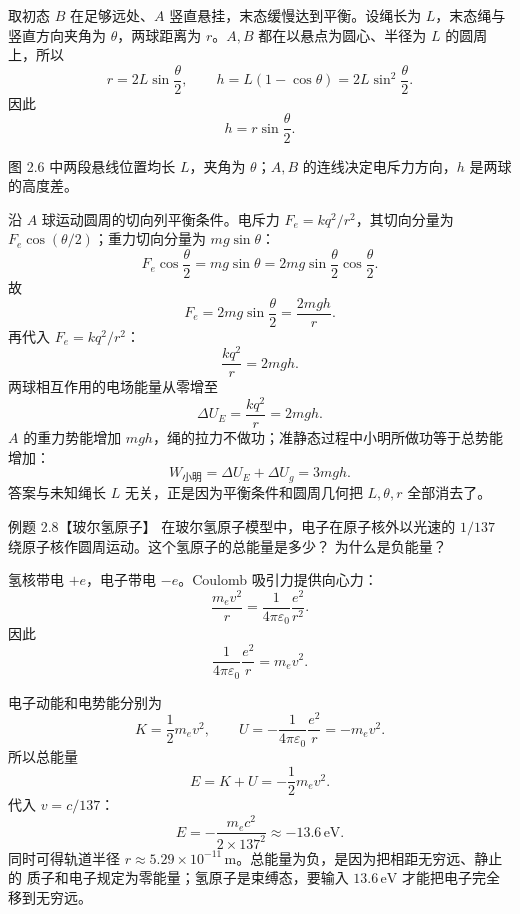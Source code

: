 \begin{xesolution}
取初态 $B$ 在足够远处、$A$ 竖直悬挂，末态缓慢达到平衡。设绳长为 $L$，末态绳与竖直方向夹角为
$\theta$，两球距离为 $r$。$A,B$ 都在以悬点为圆心、半径为 $L$ 的圆周上，所以
\[
  r=2L\sin\frac\theta2,
  \qquad h=L(1-\cos\theta)=2L\sin^2\frac\theta2.
\]
因此
\[
  \boxed{h=r\sin\frac\theta2}.
\]

图 2.6 中两段悬线位置均长 $L$，夹角为 $\theta$；$A,B$ 的连线决定电斥力方向，$h$ 是两球的高度差。

\repellingSpheresFigure
{}

沿 $A$ 球运动圆周的切向列平衡条件。电斥力
$F_e=kq^2/r^2$，其切向分量为 $F_e\cos(\theta/2)$；重力切向分量为 $mg\sin\theta$：
\[
  F_e\cos\frac\theta2=mg\sin\theta
  =2mg\sin\frac\theta2\cos\frac\theta2.
\]
故
\[
  F_e=2mg\sin\frac\theta2=\frac{2mgh}{r}.
\]
再代入 $F_e=kq^2/r^2$：
\[
  \frac{kq^2}{r}=2mgh.
\]
两球相互作用的电场能量从零增至
\[
  \boxed{\Delta U_E=\frac{kq^2}{r}=2mgh}.
\]
$A$ 的重力势能增加 $mgh$，绳的拉力不做功；准静态过程中小明所做功等于总势能增加：
\[
  \boxed{W_{\text{小明}}=\Delta U_E+\Delta U_g=3mgh}.
\]
答案与未知绳长 $L$ 无关，正是因为平衡条件和圆周几何把 $L,\theta,r$ 全部消去了。
\end{xesolution}

\begin{origexamplebox}{例题 2.8【玻尔氢原子】}
在玻尔氢原子模型中，电子在原子核外以光速的 $1/137$ 绕原子核作圆周运动。这个氢原子的总能量是多少？
为什么是负能量？
\end{origexamplebox}

\begin{xesolution}
氢核带电 $+e$，电子带电 $-e$。Coulomb 吸引力提供向心力：
\[
  \frac{m_ev^2}{r}=\frac{1}{4\pi\varepsilon_0}\frac{e^2}{r^2}.
\]
因此
\[
  \frac{1}{4\pi\varepsilon_0}\frac{e^2}{r}=m_ev^2.
\]

\bohrAtomFigure

电子动能和电势能分别为
\[
  K=\frac12m_ev^2,
  \qquad U=-\frac{1}{4\pi\varepsilon_0}\frac{e^2}{r}=-m_ev^2.
\]
所以总能量
\[
  E=K+U=-\frac12m_ev^2.
\]
代入 $v=c/137$：
\[
  \boxed{E=-\frac{m_ec^2}{2\times137^2}
  \approx-13.6\,\mathrm{eV}}.
\]
同时可得轨道半径 $r\approx5.29\times10^{-11}\,\mathrm m$。总能量为负，是因为把相距无穷远、静止的
质子和电子规定为零能量；氢原子是束缚态，要输入 $13.6\,\mathrm{eV}$ 才能把电子完全移到无穷远。
\end{xesolution}

